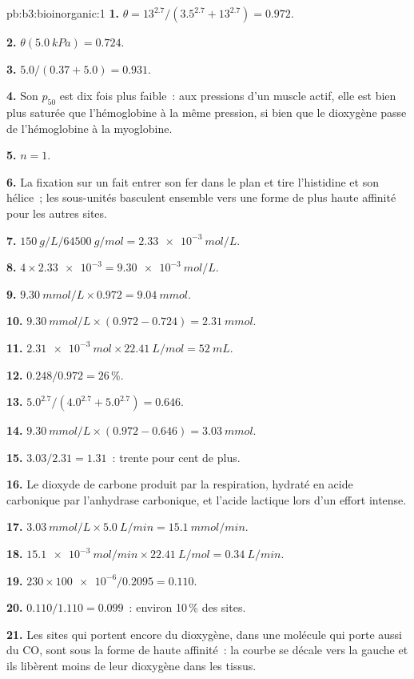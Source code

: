 \begin{solution}{pb:b3:bioinorganic:1}
\textbf{1.} $\theta = 13^{2.7}/(3.5^{2.7} + 13^{2.7}) = 0.972$.

\textbf{2.} $\theta(\qty{5.0}{kPa}) = 0.724$.

\textbf{3.} $5.0/(0.37 + 5.0) = 0.931$.

\textbf{4.} Son $p_{50}$ est dix fois plus faible~: aux pressions d'un muscle actif, elle est bien plus
saturée que l'hémoglobine à la même pression, si bien que le dioxygène
passe de l'hémoglobine à la myoglobine.

\textbf{5.} $n = 1$.

\textbf{6.} La fixation sur un  fait entrer son fer dans le plan et
tire l'histidine et son hélice~; les sous-unités basculent ensemble vers
une forme de plus haute affinité pour les autres sites.

\textbf{7.} $\qty{150}{g/L}/\qty{64500}{g/mol} = \qty{2.33e-3}{mol/L}$.

\textbf{8.} $4 \times \num{2.33e-3} = \qty{9.30e-3}{mol/L}$.

\textbf{9.} $\qty{9.30}{mmol/L} \times 0.972 = \qty{9.04}{mmol}$.

\textbf{10.} $\qty{9.30}{mmol/L} \times (0.972 - 0.724) = \qty{2.31}{mmol}$.

\textbf{11.} $\qty{2.31e-3}{mol} \times \qty{22.41}{L/mol} = \qty{52}{mL}$.

\textbf{12.} $0.248/0.972 = 26$\,\%.

\textbf{13.} $5.0^{2.7}/(4.0^{2.7} + 5.0^{2.7}) = 0.646$.

\textbf{14.} $\qty{9.30}{mmol/L} \times (0.972 - 0.646) = \qty{3.03}{mmol}$.

\textbf{15.} $3.03/2.31 = 1.31$~: trente pour cent de plus.

\textbf{16.} Le dioxyde de carbone produit par la respiration, hydraté en
acide carbonique par l'anhydrase carbonique, et l'acide lactique lors d'un
effort intense.

\textbf{17.} $\qty{3.03}{mmol/L} \times \qty{5.0}{L/min} = \qty{15.1}{mmol/min}$.

\textbf{18.} $\qty{15.1e-3}{mol/min} \times \qty{22.41}{L/mol} = \qty{0.34}{L/min}$.

\textbf{19.} $230 \times \num{100e-6}/0.2095 = 0.110$.

\textbf{20.} $0.110/1.110 = 0.099$~: environ 10\,\% des sites.

\textbf{21.} Les sites qui portent encore du dioxygène, dans une molécule
qui porte aussi du CO, sont sous la forme de haute affinité~: la courbe se
décale vers la gauche et ils libèrent moins de leur dioxygène dans les
tissus.


\end{solution}
